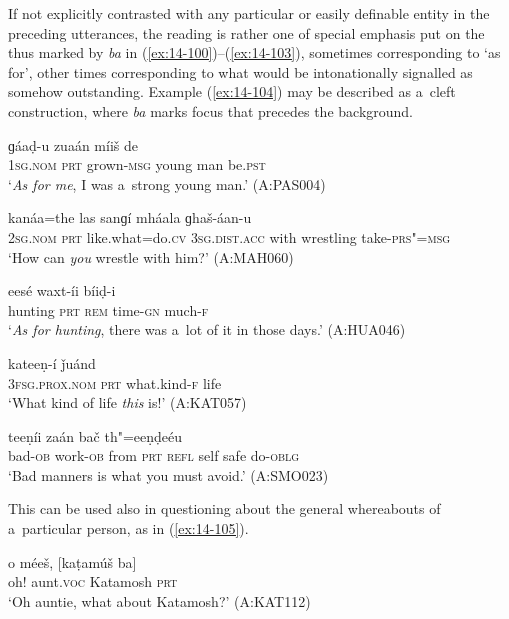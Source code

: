 If not explicitly contrasted with any particular or easily definable entity in the preceding utterances, the reading is rather one of special emphasis put on the  thus marked by \textit{ba} in (\ref{ex:14-100})--(\ref{ex:14-103}), sometimes corresponding to  `as for', other times corresponding to what would be intonationally signalled as somehow outstanding. Example (\ref{ex:14-104}) may be described as a~cleft construction, where \textit{ba} marks focus that precedes the background.

\begin{exe}
\ex
\label{ex:14-100}
\gll [ma ba] ɡáaḍ-u zuaán míiš de \\
\textsc{1sg.nom} \textsc{prt} grown-\textsc{msg} young man be.\textsc{pst}  \\
\glt `\textit{As for me}, I was a~strong young man.' (A:PAS004)

\ex
\label{ex:14-101}
\gll [tu ba] kanáa=the las sanɡí  mháala ɡhaš-áan-u \\
\textsc{2sg.nom} \textsc{prt} like.what=do.\textsc{cv} \textsc{3sg.dist.acc} with wrestling take-\textsc{prs"=msg }\\
\glt `How can \textit{you} wrestle with him?' (A:MAH060)

\ex
\label{ex:14-102}
\gll [neečíir ba] eesé waxt-íi bíiḍ-i \\
hunting \textsc{prt} \textsc{rem} time-\textsc{gn} much-\textsc{f } \\
\glt `\textit{As for hunting}, there was a~lot of it in those days.' (A:HUA046)

\ex
\label{ex:14-103}
\gll [aní ba] kateeṇ-í ǰuánd \\
\textsc{3fsg.prox.nom} \textsc{prt} what.kind-\textsc{f} life  \\
\glt `What kind of life \textit{this} is!' (A:KAT057)

\ex
\label{ex:14-104}
 teeṇíi zaán bač th"=eeṇḍeéu \\
bad-\textsc{ob} work-\textsc{ob } from \textsc{prt} \textsc{refl} self safe do-\textsc{oblg} \\
\glt `Bad manners is what you must avoid.' (A:SMO023)
\end{exe}

This can be used also in questioning about the general whereabouts of a~particular person, as in (\ref{ex:14-105}).

\begin{exe}
\ex
\label{ex:14-105}
\gll o méeš, [kaṭamúš ba] \\
oh! aunt.\textsc{voc} Katamosh \textsc{prt } \\
\glt `Oh auntie, what about Katamosh?' (A:KAT112)
\end{exe}

